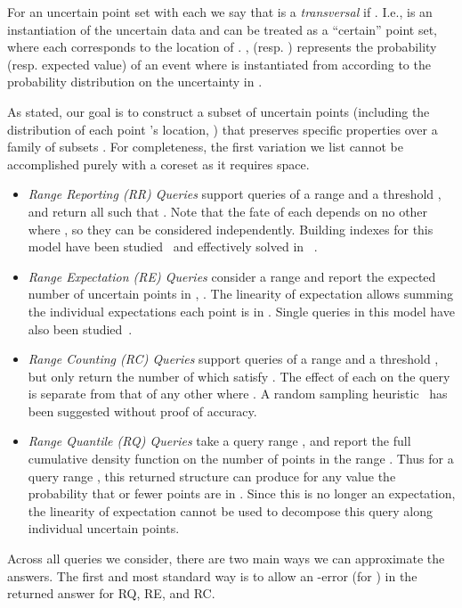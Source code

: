 \documentclass[11pt]{myclass}
\newcommand{\RR}{\textsf{RR}\xspace}
\newcommand{\RC}{\textsf{RC}\xspace}
\newcommand{\RE}{\textsf{RE}\xspace}
\newcommand{\RQ}{\textsf{RQ}\xspace}
\newcommand{\denselist}{\vspace{-.1in} \itemsep -2pt\parsep=-1pt\partopsep -2pt}
\begin{document}
For an uncertain point set  with each  we say that  is a \emph{transversal} if .  I.e.,  is an instantiation of the uncertain data  and can be treated as a ``certain'' point set, where each  corresponds to the location of .   
, (resp. ) represents the probability (resp. expected value) of an event  where  is instantiated from  according to the probability distribution on the uncertainty in .  

As stated, our goal is to construct a subset of uncertain points  (including the distribution of each point 's location, ) that preserves specific properties over a family of subsets .  For completeness, the first variation we list cannot be accomplished purely with a coreset as it requires  space.  

\begin{itemize}  \denselist
\item \emph{Range Reporting (\RR) Queries} support queries of a range  and a threshold , and return all  such that . Note that the fate of each  depends on no other  where , so they can be considered independently. Building indexes for this model have been studied~\cite{threshquery,efficientquery,TCXNKP05,ZLTZW12} and effectively solved in ~\cite{ACTY09}.  
\item \emph{Range Expectation (\RE) Queries} consider a range  and report the expected number of uncertain points in , . The linearity of expectation allows summing the individual expectations each point  is in . Single queries in this model have also been studied~\cite{JKV07,BDJRV05,JMMV07}.
\item \emph{Range Counting (\RC) Queries} support queries of a range  and a threshold , but only return the number of  which satisfy .  
The effect of each  on the query is separate from that of any other  where .  A random sampling heuristic~\cite{aggregate} has been suggested without proof of accuracy.  
\item \emph{Range Quantile (\RQ) Queries} take a query range , and report the full cumulative density function on the number of points in the range .  Thus for a query range , this returned structure can produce for any value  the probability that  or fewer points are in .  
Since this is no longer an expectation, the linearity of expectation cannot be used to decompose this query along individual uncertain points.  
\end{itemize}
\vspace{-2mm}
Across all queries we consider, there are two main ways we can approximate the answers.  The first and most standard way is to allow an -error (for ) in the returned answer for \RQ, \RE, and \RC. 
\end{document}
